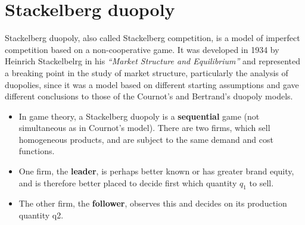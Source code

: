 \documentclass[]{report}
\begin{document}
\section{Stackelberg duopoly}
Stackelberg duopoly, also called Stackelberg competition, is a model of imperfect competition based on a non-cooperative game. It was developed in 1934 by Heinrich Stackelbelrg in his \textit{“Market Structure and Equilibrium”} and represented a breaking point in the study of market structure, particularly the analysis of duopolies, since it was a model based on different starting assumptions and gave different conclusions to those of the Cournot’s and Bertrand’s duopoly models.

\begin{itemize}
\item In game theory, a Stackelberg duopoly is a \textbf{sequential} game (not simultaneous as in Cournot’s model). There are two firms, which sell homogeneous products, and are subject to the same demand and cost functions. 
\item One firm, the \textbf{leader}, is perhaps better known or has greater brand equity, and is therefore better placed to decide first which quantity $q_1$ to sell.
\item The other firm, the \textbf{follower}, observes this and decides on its production quantity q2. 
\end{itemize}
\end{document}
